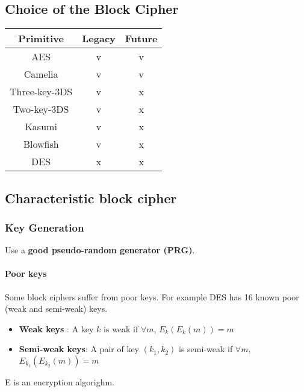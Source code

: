
\subsection{Choice of the Block Cipher}
\begin{center}
    \begin{tabular}{|c|c|c|}
        \hline
        \textbf{Primitive} & \textbf{Legacy} & \textbf{Future} \\
        \hline
        AES & \textcolor{green!50!black}{v} &
        \textcolor{green!50!black}{v} \\
        Camelia & \textcolor{green!50!black}{v} &
        \textcolor{green!50!black}{v} \\
        \hline
        Three-key-3DS & \textcolor{green!50!black}{v} &
        \textcolor{red!50!black}{x} \\
        Two-key-3DS & \textcolor{green!50!black}{v} &
        \textcolor{red!50!black}{x} \\
        Kasumi & \textcolor{green!50!black}{v} &
        \textcolor{red!50!black}{x} \\
        Blowfish & \textcolor{green!50!black}{v} &
        \textcolor{red!50!black}{x} \\
        \hline
        DES & \textcolor{red!50!black}{x} & \textcolor{red!50!black}{x}\\
        \hline
    \end{tabular}
\end{center}

\subsection{Characteristic block cipher}

\subsubsection{Key Generation}
Use a \textbf{good pseudo-random generator (PRG)}.

\paragraph{Poor keys}
Some block ciphers suffer from poor keys. For example DES has 16 known poor
(weak and semi-weak) keys. 

\begin{itemize}
	\item\textbf{Weak keys} : A key $k$ is weak if $\forall m$, $E_k(E_k(m)) = m$
	\item\textbf{Semi-weak keys}: A pair of key $(k_1,k_2)$ is semi-weak if $\forall m$,
	$E_{k_1}(E_{k_2}(m))=m$
\end{itemize}
E is an encryption algorighm.

